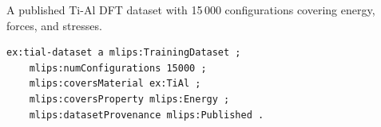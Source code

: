 A published Ti-Al DFT dataset with 15\,000 configurations covering energy, forces, and stresses.
\begin{lstlisting}[language=turtle]
ex:tial-dataset a mlips:TrainingDataset ;
    mlips:numConfigurations 15000 ;
    mlips:coversMaterial ex:TiAl ;
    mlips:coversProperty mlips:Energy ;
    mlips:datasetProvenance mlips:Published .
\end{lstlisting}
